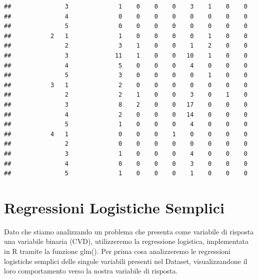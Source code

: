 \documentclass{article}\usepackage[]{graphicx}\usepackage[]{xcolor}
\makeatletter
\newenvironment{kframe}{%
 \def\at@end@of@kframe{}%
 \ifinner\ifhmode%
  \def\at@end@of@kframe{\end{minipage}}%
  \begin{minipage}{\columnwidth}%
 \fi\fi%
 \def\FrameCommand##1{\hskip\@totalleftmargin \hskip-\fboxsep
 \colorbox{shadecolor}{##1}\hskip-\fboxsep
     \hskip-\linewidth \hskip-\@totalleftmargin \hskip\columnwidth}%
 \MakeFramed {\advance\hsize-\width
   \@totalleftmargin\z@ \linewidth\hsize
   \@setminipage}}%
 {\par\unskip\endMakeFramed%
 \at@end@of@kframe}
\newenvironment{knitrout}{}{} %
\makeatother
\begin{document}
\begin{knitrout}
\begin{kframe}
\begin{verbatim}
##               3              1    0    0    0    3    1    0    0
##               4              0    0    0    0    0    0    0    0
##               5              0    0    0    0    0    0    0    0
##           2   1              1    0    0    0    0    1    0    0
##               2              3    1    0    0    1    2    0    0
##               3             11    1    0    0   10    1    0    0
##               4              5    0    0    0    4    0    0    0
##               5              3    0    0    0    0    1    0    0
##           3   1              2    0    0    0    0    0    0    0
##               2              2    1    0    0    3    0    1    0
##               3              8    2    0    0   17    0    0    0
##               4              2    0    0    0   14    0    0    0
##               5              1    0    0    0    4    0    0    0
##           4   1              0    0    0    1    0    0    0    0
##               2              0    0    0    0    0    0    0    0
##               3              1    0    0    0    4    0    0    0
##               4              0    0    0    0    3    0    0    0
##               5              1    0    0    0    1    0    0    0
\end{verbatim}
\end{kframe}
\end{knitrout}
    
\clearpage




\section{Regressioni Logistiche Semplici}
  Dato che stiamo analizzando un problema che presenta come variabile di 
  risposta una variabile binaria (CVD), utilizzeremo la regressione logistica, 
  implementata in R tramite la funzione glm().
  Per prima cosa analizzeremo le regressioni logistiche semplici delle singole
  variabili presenti nel Dataset, visualizzandone il loro comportamento verso la
  nostra variabile di risposta.
  
\end{document}
